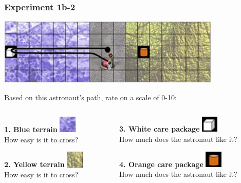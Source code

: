 \documentclass{beamer}
\begin{document}
\begin{frame}
\frametitle{Experiment 1b-2}
\begin{center}
\includegraphics[width=0.8\textwidth]{experiment_1b-2.png}
\end{center}
\vspace{0.3cm}
Based on this astronaut's path, rate on a scale of 0-10:
\begin{columns}
\begin{column}{0.5\textwidth}
\textbf{1. Blue terrain} \includegraphics[width=0.8cm]{blue_terrain.png}\\
How easy is it to cross?
\vspace{0.3cm}

\textbf{2. Yellow terrain} \includegraphics[width=0.8cm]{yellow_terrain.png}\\
How easy is it to cross?
\end{column}
\begin{column}{0.5\textwidth}
\textbf{3. White care package} \includegraphics[width=0.8cm]{white_carepackage.png}\\
How much does the astronaut like it?
\vspace{0.3cm}

\textbf{4. Orange care package} \includegraphics[width=0.8cm]{orange_carepackage.png}\\
How much does the astronaut like it?
\end{column}
\end{columns}
\end{frame}
\end{document}
